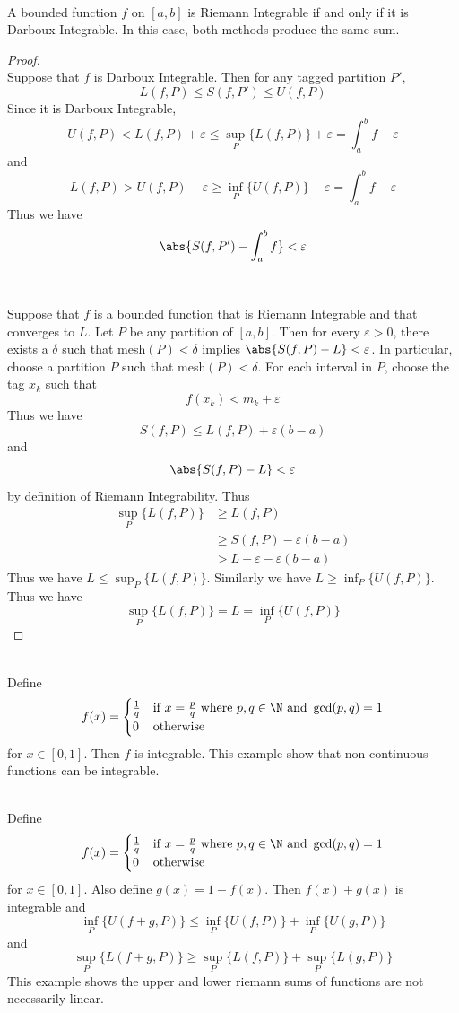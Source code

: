 \documentclass[a4paper]{article}
\begin{document}
\begin{thm}{}{}\\ A bounded function $f$ on $[a,b]$ is Riemann Integrable if and only if it is Darboux Integrable. In this case, both methods produce the same sum. 
\begin{proof}\\ Suppose that $f$ is Darboux Integrable. Then for any tagged partition $P'$, $$L(f,P)\leq S(f,P')\leq U(f,P)$$ Since it is Darboux Integrable, $$U(f,P)<L(f,P)+\varepsilon\leq\sup_P\{L(f,P)\}+\varepsilon=\int_a^b f+\varepsilon$$ and $$L(f,P)>U(f,P)-\varepsilon\geq\inf_P\{U(f,P)\}-\varepsilon=\int_a^b f-\varepsilon$$ Thus we have $$\abs{S(f,P')-\int_a^b f}<\varepsilon$$ \\~\\
Suppose that $f$ is a bounded function that is Riemann Integrable and that converges to $L$. Let $P$ be any partition of $[a,b]$. Then for every $\varepsilon>0$, there exists a $\delta$ such that mesh$(P)<\delta$ implies $\abs{S(f,P)-L}<\varepsilon$. In particular, choose a partition $P$ such that mesh$(P)<\delta$. For each interval in $P$, choose the tag $x_k$ such that $$f(x_k)<m_k+\varepsilon$$ Thus we have $$S(f,P)\leq L(f,P)+\varepsilon(b-a)$$ and $$\abs{S(f,P)-L}<\varepsilon$$ by definition of Riemann Integrability. Thus 
\begin{align*}
\sup_P\{L(f,P)\}&\geq L(f,P)\\
&\geq S(f,P)-\varepsilon(b-a)\\
&>L-\varepsilon-\varepsilon(b-a)
\end{align*}
Thus we have $L\leq\sup_P\{L(f,P)\}$. Similarly we have $L\geq\inf_P\{U(f,P)\}$. Thus we have $$\sup_P\{L(f,P)\}=L=\inf_P\{U(f,P)\}$$
\end{proof}
\end{thm}

\begin{eg}{}{}\\ Define $$f(x)=\begin{cases}
\frac{1}{q} & \text{if } x=\frac{p}{q} \text{ where } p,q\in\N \text{ and } \gcd(p,q)=1\\
0 & \text{otherwise }
\end{cases}$$ for $x\in[0,1]$. Then $f$ is integrable. This example show that non-continuous functions can be integrable. 
\end{eg}

\begin{eg}{}{}\\ Define $$f(x)=\begin{cases}
\frac{1}{q} & \text{if } x=\frac{p}{q} \text{ where } p,q\in\N \text{ and } \gcd(p,q)=1\\
0 & \text{otherwise }
\end{cases}$$ for $x\in[0,1]$. Also define $g(x)=1-f(x)$.  Then $f(x)+g(x)$ is integrable and $$\inf_{P}\{U(f+g,P)\}\leq\inf_{P}\{U(f,P)\}+\inf_{P}\{U(g,P)\}$$ and $$\sup_{P}\{L(f+g,P)\}\geq\sup_{P}\{L(f,P)\}+\sup_{P}\{L(g,P)\}$$ This example shows the upper and lower riemann sums of functions are not necessarily linear. 
\end{eg}
\end{document}
